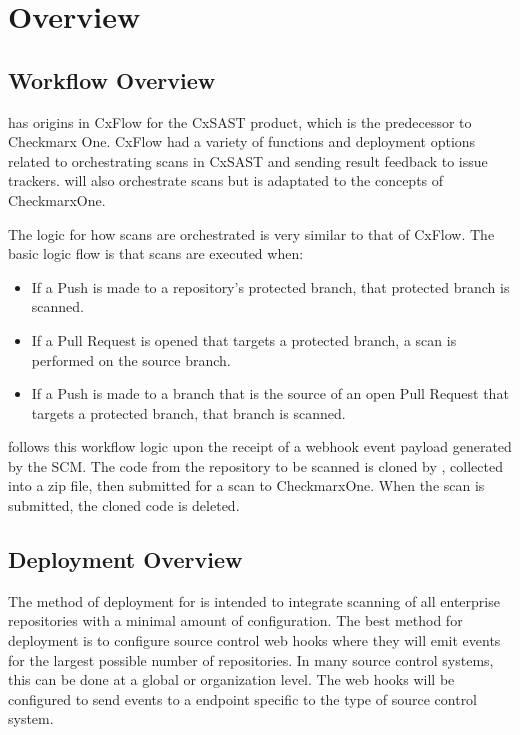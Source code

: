 \chapter{Overview}\label{sec:overview}

\section{Workflow Overview}

\cxoneflow has origins in CxFlow for the CxSAST product, which is the predecessor to Checkmarx One.  CxFlow
had a variety of functions and deployment options related to orchestrating scans in CxSAST and sending
result feedback to issue trackers.  \cxoneflow will also orchestrate scans but is adaptated to the
concepts of CheckmarxOne.

The \cxoneflow logic for how scans are orchestrated is very similar to that of CxFlow.  The basic
logic flow is that scans are executed when:

\begin{itemize}
    \item If a Push is made to a repository's protected branch, that protected branch is scanned.
    \item If a Pull Request is opened that targets a protected branch, a scan is performed on
    the source branch.
    \item If a Push is made to a branch that is the source of an open Pull Request that targets
    a protected branch, that branch is scanned.
\end{itemize}


\cxoneflow follows this workflow logic upon the receipt of a webhook event payload generated by the SCM.
The code from the repository to be scanned is cloned by \cxoneflow, collected into a zip file, then submitted
for a scan to CheckmarxOne.  When the scan is submitted, the cloned code is deleted.


\section{Deployment Overview}

The method of deployment for \cxoneflow is intended to integrate scanning of all enterprise repositories
with a minimal amount of configuration.  The best method for deployment is to configure source control web
hooks where they will emit events for the largest possible number of repositories.  In many source control
systems, this can be done at a global or organization level.  The web hooks will be configured to send events
to a \cxoneflow endpoint specific to the type of source control system.

